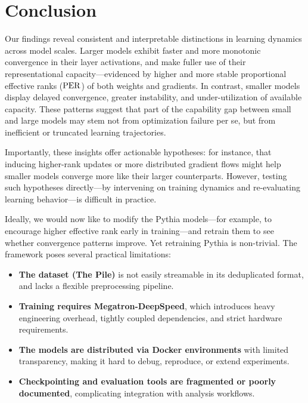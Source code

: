 \begin{table}[!t]
    \centering
    
    \caption{Matthew's Correlation Coefficient %
    between binary variables indicating whether a given layer converges early in training and whether it maintains a stable PER of the parameters ($\vtheta$) and gradients ($\nabla\vtheta$) throughout training for both $\attention$ and $\mlp$.}
    \label{tab:model_correlation}
\end{table}



\section{Conclusion}

Our findings reveal consistent and interpretable distinctions in learning dynamics across model scales. Larger models exhibit faster and more monotonic convergence in their layer activations, and make fuller use of their representational capacity—evidenced by higher and more stable proportional effective ranks ($\mathrm{PER}$) of both weights and gradients. In contrast, smaller models display delayed convergence, greater instability, and under-utilization of available capacity. These patterns suggest that part of the capability gap between small and large models may stem not from optimization failure per se, but from inefficient or truncated learning trajectories.

Importantly, these insights offer actionable hypotheses: for instance, that inducing higher-rank updates or more distributed gradient flows might help smaller models converge more like their larger counterparts. However, testing such hypotheses directly—by intervening on training dynamics and re-evaluating learning behavior—is difficult in practice.

Ideally, we would now like to modify the Pythia models—for example, to encourage higher effective rank early in training—and retrain them to see whether convergence patterns improve. Yet retraining Pythia is non-trivial. The framework poses several practical limitations:

\begin{itemize}[label=\xmark]
    \item \textbf{The dataset (The Pile)} is not easily streamable in its deduplicated format, and lacks a flexible preprocessing pipeline.
    \item \textbf{Training requires Megatron-DeepSpeed}, which introduces heavy engineering overhead, tightly coupled dependencies, and strict hardware requirements.
    \item \textbf{The models are distributed via Docker environments} with limited transparency, making it hard to debug, reproduce, or extend experiments.
    \item \textbf{Checkpointing and evaluation tools are fragmented or poorly documented}, complicating integration with analysis workflows.
\end{itemize}


